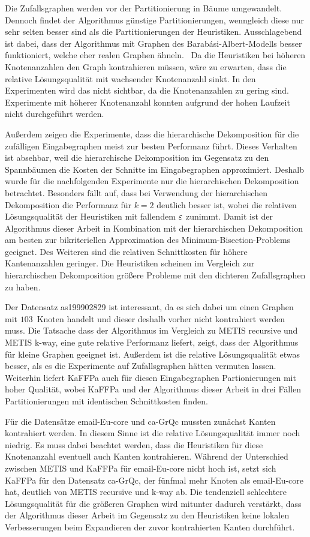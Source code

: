 Die Zufallsgraphen werden vor der Partitionierung in Bäume umgewandelt. 
Dennoch findet der Algorithmus günstige Partitionierungen, wenngleich diese nur sehr selten besser sind als die Partitionierungen der Heuristiken.
Ausschlagebend ist dabei, dass der Algorithmus mit Graphen des Barabási-Albert-Modells besser funktioniert, welche eher realen Graphen ähneln.~\cite{AB02}
Da die Heuristiken bei höheren Knotenanzahlen den Graph kontrahieren müssen, wäre zu erwarten, dass die relative Lösungsqualität mit wachsender Knotenanzahl sinkt.
In den Experimenten wird das nicht sichtbar, da die Knotenanzahlen zu gering sind.
Experimente mit höherer Knotenanzahl konnten aufgrund der hohen Laufzeit nicht durchgeführt werden.

Außerdem zeigen die Experimente, dass die hierarchische Dekomposition für die zufälligen Eingabegraphen meist zur besten Performanz führt.
Dieses Verhalten ist absehbar, weil die hierarchische Dekomposition im Gegensatz zu den Spannbäumen die Kosten der Schnitte im Eingabegraphen approximiert.
Deshalb wurde für die nachfolgenden Experimente nur die hierarchischen Dekomposition betrachtet.
Besonders fällt auf, dass bei Verwendung der hierarchischen Dekomposition die Performanz für $k=2$ deutlich besser ist, wobei die relativen Lösungsqualität der Heuristiken mit fallendem $\varepsilon$ zunimmt.
Damit ist der Algorithmus dieser Arbeit in Kombination mit der hierarchischen Dekomposition am besten zur bikriteriellen Approximation des Minimum-Bisection-Problems geeignet.
Des Weiteren sind die relativen Schnittkosten für höhere Kantenanzahlen geringer.
Die Heuristiken scheinen im Vergleich zur hierarchischen Dekomposition größere Probleme mit den dichteren Zufallsgraphen zu haben.

Der Datensatz as199902829 ist interessant, da es sich dabei um einen Graphen mit $103$~Knoten handelt und dieser deshalb vorher nicht kontrahiert werden muss.
Die Tatsache dass der Algorithmus im Vergleich zu METIS recursive und METIS k-way, eine gute relative Performanz liefert, zeigt, dass der Algorithmus für kleine Graphen geeignet ist.
Außerdem ist die relative Lösungsqualität etwas besser, als es die Experimente auf Zufallsgraphen hätten vermuten lassen.
Weiterhin liefert KaFFPa auch für diesen Eingabegraphen Partionierungen mit hoher Qualität, wobei KaFFPa und der Algorithmus dieser Arbeit in drei Fällen Partitionierungen mit identischen Schnittkosten finden.

Für die Datensätze email-Eu-core und ca-GrQc mussten zunächst Kanten kontrahiert werden.
In diesem Sinne ist die relative Lösungsqualität immer noch niedrig.
Es muss dabei beachtet werden, dass die Heuristiken für diese Knotenanzahl eventuell auch Kanten kontrahieren.
Während der Unterschied zwischen METIS und KaFFPa für email-Eu-core nicht hoch ist, setzt sich KaFFPa für den Datensatz ca-GrQc, der fünfmal mehr Knoten als email-Eu-core hat, deutlich von METIS recursive und k-way ab.
Die tendenziell schlechtere Lösungsqualität für die größeren Graphen wird mitunter dadurch verstärkt, dass der Algorithmus dieser Arbeit im Gegensatz zu den Heuristiken keine lokalen Verbesserungen beim Expandieren der zuvor kontrahierten Kanten durchführt.


